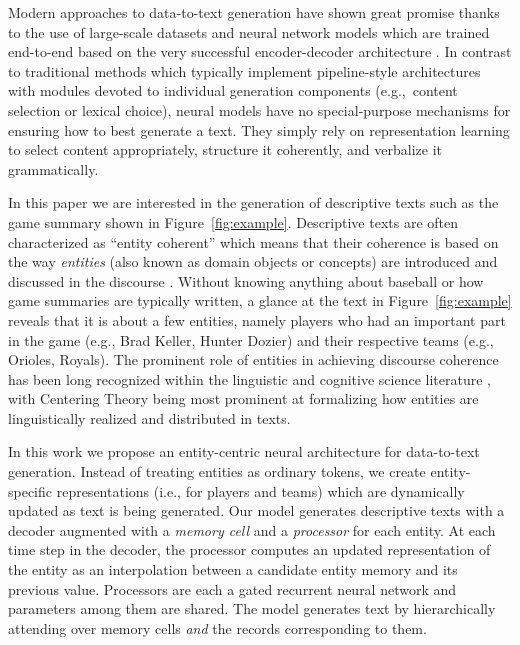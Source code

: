 \documentclass[11pt,a4paper]{article}
\begin{document}
Modern approaches to data-to-text generation have shown great promise
\cite{D16-1128,N16-1086,
  N18-1137,DBLP:journals/corr/abs-1809-00582,D17-1239}
thanks to the use of large-scale datasets and neural network models
which are trained end-to-end based on the very successful
encoder-decoder architecture \cite{DBLP:journals/corr/BahdanauCB14}. In contrast to
traditional methods which typically implement pipeline-style
architectures \cite{reiter-dale:00} with modules devoted to individual
generation components (e.g.,~content selection or lexical choice),
neural models have no special-purpose mechanisms for ensuring how to
best generate a text. They simply rely on representation learning 
to select content appropriately, structure it coherently, and
verbalize it grammatically.

In this paper we are interested in the generation of descriptive texts
such as the game summary shown in
Figure~\ref{fig:example}. Descriptive texts are often characterized as
``entity coherent'' which means that their coherence is based on the
way \emph{entities} (also known as domain objects or concepts) are
introduced and discussed in the discourse
\cite{P04-1050}. Without knowing anything about baseball or how
game summaries are typically written, a glance at the text in
Figure~\ref{fig:example} reveals that it is about a few entities,
namely players who had an important part in the game (e.g., Brad
Keller, Hunter Dozier) and their respective teams (e.g., Orioles,
Royals). The prominent role of entities in achieving discourse
coherence has been long recognized within the linguistic and cognitive
science literature
\cite{Kuno:1972a,Chafe:1976a,Halliday:Hasan:76,Karttunen:1976a,Clark:Haviland:1977a,Prince:1981a},
with Centering Theory \cite{DBLP:journals/coling/GroszJW95} being most prominent
at formalizing how entities are linguistically realized and
distributed in texts.



In this work we propose an entity-centric neural architecture for
data-to-text generation. Instead of treating entities as ordinary
tokens, we create entity-specific representations (i.e., for players
and teams) which are dynamically updated as text is being generated.
Our model generates descriptive texts with a decoder augmented with a
\emph{memory cell} and a \emph{processor} for each entity.
At each time step in the decoder, the processor computes an updated
representation of the entity as an interpolation between a candidate
entity memory and its previous value. Processors are each a gated
recurrent neural network and parameters among them are shared.  The
model generates text by hierarchically attending over memory cells
\emph{and} the records corresponding to them.
\end{document}
